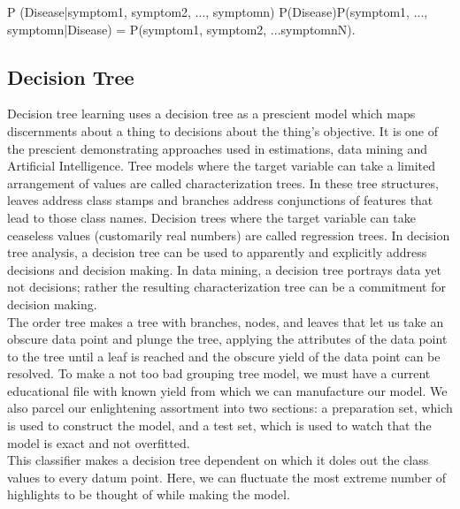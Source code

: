 \documentclass[oneside,12pt]{Classes/VTU}
\begin{document}
       	P (Disease|symptom1, symptom2, ..., symptomn) P(Disease)P(symptom1, ..., symptomn|Disease) = P(symptom1, symptom2, ...symptomnN).\\
    	
    	
    
    
    	\subsection{Decision Tree}
    	Decision tree learning uses a decision tree as a prescient model which maps discernments about a thing to decisions about the thing's objective. It is one of the prescient demonstrating approaches used in estimations, data mining and Artificial Intelligence. Tree models where the target variable can take a limited arrangement of values are called characterization trees. In these tree structures, leaves address class stamps and branches address conjunctions of features that lead to those class names. Decision trees where the target variable can take ceaseless values (customarily real numbers) are called regression trees. In decision tree analysis, a decision tree can be used to apparently and explicitly address decisions and decision making. In data mining, a decision tree portrays data yet not decisions; rather the resulting characterization tree can be a commitment for decision making.\\ 
    	
    	The order tree makes a tree with branches, nodes, and leaves that let us take an obscure data point and plunge the tree, applying the attributes of the data point to the tree until a leaf is reached and the obscure yield of the data point can be resolved. To make a not too bad grouping tree model, we must have a current educational file with known yield from which we can manufacture our model. We also parcel our enlightening assortment into two sections: a preparation set, which is used to construct the model, and a test set, which is used to watch that the model is exact and not overfitted. \\ 
    	
    	This classifier makes a decision tree dependent on which it doles out the class values to every datum point. Here, we can fluctuate the most extreme number of highlights to be thought of while making the model.\\
    	
\end{document}
